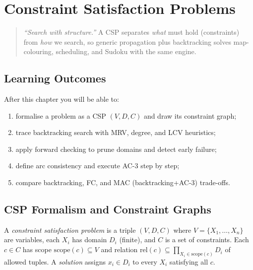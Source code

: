 \chapter{Constraint Satisfaction Problems}
\label{ch:csp}

\begin{quote}
\emph{``Search with structure.''} A CSP separates \emph{what} must hold (constraints) from \emph{how} we search, so generic propagation plus backtracking solves map-colouring, scheduling, and Sudoku with the same engine.
\end{quote}

\noindent{}
\vspace{0.4em}

\section*{Learning Outcomes}
After this chapter you will be able to:
\begin{enumerate}[label=(L\arabic*)]
    \item formalise a problem as a CSP $(V,D,C)$ and draw its constraint graph;
    \item trace backtracking search with MRV, degree, and LCV heuristics;
    \item apply forward checking to prune domains and detect early failure;
    \item define arc consistency and execute AC-3 step by step;
    \item compare backtracking, FC, and MAC (backtracking+AC-3) trade-offs.
\end{enumerate}

\section{CSP Formalism and Constraint Graphs}
\label{sec:csp-formal}

\begin{definition}[CSP]
A \emph{constraint satisfaction problem} is a triple $(V,D,C)$ where $V=\{X_1,\dots,X_n\}$ are variables, each $X_i$ has domain $D_i$ (finite), and $C$ is a set of constraints. Each $c\in C$ has scope $\mathrm{scope}(c)\subseteq V$ and relation $\mathrm{rel}(c)\subseteq\prod_{X_i\in\mathrm{scope}(c)} D_i$ of allowed tuples. A \emph{solution} assigns $x_i\in D_i$ to every $X_i$ satisfying all $c$.
\end{definition}

